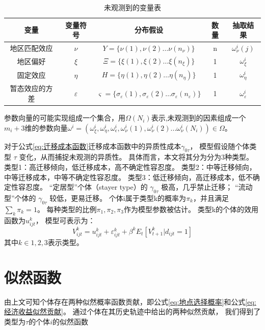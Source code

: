 \documentclass[a4paper,12pt,oneside]{book} %
\begin{document}
\begin{table}[!ht]
\centering
\begin{tabular}{@{}ccccc@{}}
\toprule
变量 & 变量符号 & 分布假设 & 数量 & 抽取结果 \\ \midrule
地区匹配效应 & $\nu$ & $Y=\{\nu(1),\nu(2)\ldots\nu(n_{\nu})\}$ & n & $\omega^{i}_{\nu}(j)$\\
地区偏好 & $\xi$ & $\Xi=\{\xi(1),\xi(2)\ldots\xi(n_{\xi})\}$ & 1 & $\omega^{i}_{\xi}$ \\
固定效应 & $\eta$ & $H=\{\eta(1),\eta(2)\ldots\eta(n_\eta)\}$ & 1 & $\omega^{i}_{\eta}$ \\
暂态效应的方差 & $\varepsilon$ & $\varsigma=\{\sigma_{\varepsilon}(1),\sigma_{\varepsilon}(2)\ldots\sigma_{\varepsilon}(n_{\varepsilon})\}$ & 1 & $\omega^{i}_{\varepsilon}$ \\ \bottomrule
\end{tabular}
\caption{未观测到的变量表}
\label{tab:未观测到的变量表}
\end{table}


参数向量的可能实现组成一个集合，用$\Omega(N_{i})$表示,未观测到的因素组成一个$m_{i}+3$维的参数向量$\omega^{i}=(\omega^{i}_{\xi},\omega^{i}_{\eta},\omega^{i}_{\epsilon},\omega^{i}_{\nu}(1),\omega^{i}_{\nu}(2)...\omega^{i}_{\nu}(N_{i}))\in \Omega$。


对于公式\ref{eq:迁移成本函数}迁移成本函数中的异质性成本$\gamma_{0\tau}$，
模型假设随个体类型 $\tau$ 变化，从而捕捉未观测的异质性。
具体而言，本文将其分为分为3种类型。
类型1：高迁移倾向，低迁移成本，高不确定性容忍度。
类型2：中等迁移倾向，中等迁移成本，中等不确定性容忍度。
类型3：低迁移倾向，高迁移成本，低不确定性容忍度。
“定居型”个体（stayer type）的 $\gamma_{0\tau}$ 极高，几乎禁止迁移；
“流动型”个体的 $\gamma_{0\tau}$ 较低，更易迁移。
个体i属于类型k的概率为$\pi_k$，并且满足$\sum\limits_{k}^{} \pi_k = 1$。
每种类型的比例$\pi_1, \pi_2, \pi_3$作为模型参数被估计。
类型k的个体的效用函数为$u_{ijt}^k$，
模型可表示为：
$$V_{ijt}^k = u_{ijt}^k + \varepsilon_{ijt}^k + \beta^k E_t[V_{t+1}^k|d_{ijt}=1]$$
其中$k\in{1,2,3}$表示类型。


\section{似然函数}




由上文可知个体存在两种似然概率函数贡献，即公式\ref{eq:地点选择概率}和公式\ref{eq:经济收益似然贡献}。
通过个体在其历史轨迹中给出的两种似然贡献，
我们得到了类型为$\tau$的个体$i$的似然函数
\end{document}
